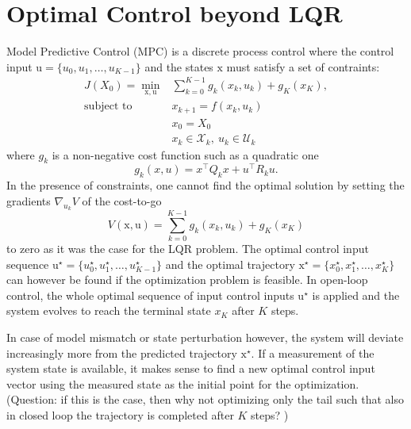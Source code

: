 \documentclass[11pt]{report}
\newcommand{\bs}[1]{\boldsymbol{#1}}
\newcommand{\bsu}{\bs{\mathrm{u}}}
\newcommand{\bsx}{\bs{\mathrm{x}}}
\begin{document}
\chapter{Optimal Control beyond LQR}
\label{sec:optimal-control-beyond-lqr}

Model Predictive Control (MPC) is a discrete process control where the control input $\bsu = \{u_0,u_1,\ldots,u_{K-1}\}$ and the states $\bsx$ must satisfy a set of contraints:
\begin{equation}
  \label{eq:MPC-general-formulation}
  \begin{aligned}
    J(X_0) = \min_{\bsx,\bsu} &\sum_{k=0}^{K-1} g_k(x_k,u_k) + g_K(x_K),\\
    \text{subject to } & x_{k+1} = f(x_k,u_k) \\
                                                       & x_0 = X_0 \\
                                                       & x_k \in \mathcal{X}_k,\ u_k \in \mathcal{U}_k
  \end{aligned}
\end{equation}
where $g_k$ is a non-negative cost function such as a quadratic one
\begin{equation}
  \label{eq:quadratic-stage-cost}
  g_k(x,u) = x^\top Q_k x + u^\top R_k u.
\end{equation}
In the presence of constraints, one cannot find the optimal solution by setting the gradients $\nabla_{u_k} V$ of the cost-to-go
\begin{equation}
  \label{eq:cost-to-go}
  V(\bsx,\bsu) = \sum_{k=0}^{K-1} g_k(x_k,u_k) + g_K(x_K)
\end{equation}
to zero as it was the case for the LQR problem. The optimal control input sequence $\bsu^\star = \{u_0^\star,u_1^\star,\ldots,u_{K-1}^\star\}$ and the optimal trajectory $\bsx^\star = \{x_0^\star,x_1^\star,\ldots,x_K^\star\}$ can however be found if the optimization problem is feasible. In open-loop control, the whole optimal sequence of input control inputs $\bsu^\star$ is applied and the system evolves to reach the terminal state $x_K$ after $K$ steps.

In case of model mismatch or state perturbation however, the system will deviate increasingly more from the predicted trajectory $\bsx^\star$. If a measurement of the system state is available, it makes sense to find a new optimal control input vector using the measured state as the initial point for the optimization. (Question: if this is the case, then why not optimizing only the tail such that also in closed loop the trajectory is completed after $K$ steps? )
\end{document}
